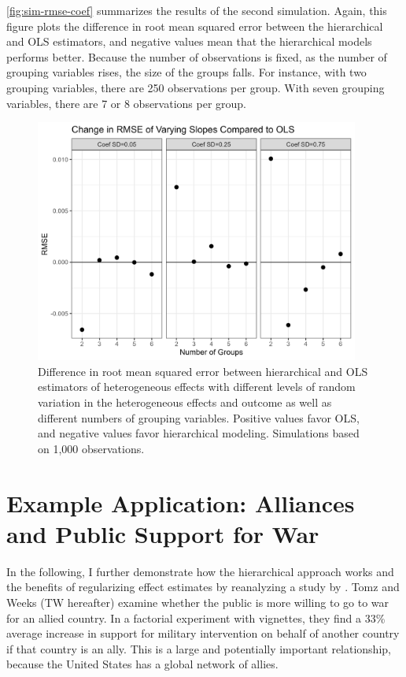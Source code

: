 \documentclass[12pt]{article}
\begin{document}
\autoref{fig:sim-rmse-coef} summarizes the results of the second simulation.
Again, this figure plots the difference in root mean squared error between the hierarchical and OLS estimators, and negative values mean that the hierarchical models performs better.
Because the number of observations is fixed, as the number of grouping variables rises, the size of the groups falls. 
For instance, with two grouping variables, there are 250 observations per group.
With seven grouping variables, there are 7 or 8 observations per group.


\begin{figure}[htpb]
	\centering
		\includegraphics[width=0.95\textwidth]{../figures/sim-rmse-coef.png}
	\caption{Difference in root mean squared error between hierarchical and OLS estimators of heterogeneous effects with different levels of random variation in the heterogeneous effects and outcome as well as different numbers of grouping variables. Positive values favor OLS, and negative values favor hierarchical modeling. Simulations based on 1,000 observations.}
	\label{fig:sim-rmse-coef}
\end{figure}





\section{Example Application: Alliances and Public Support for War} 


In the following, I further demonstrate how the hierarchical approach works and the benefits of regularizing effect estimates by reanalyzing a study by \citet{TomzWeeks2021}. 
Tomz and Weeks (TW hereafter) examine whether the public is more willing to go to war for an allied country.
In a factorial experiment with vignettes, they find a 33\% average increase in support for military intervention on behalf of another country if that country is an ally. 
This is a large and potentially important relationship, because the United States has a global network of allies. 
\end{document}
